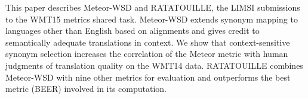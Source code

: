 This paper describes Meteor-WSD and RATATOUILLE, the LIMSI submissions to the WMT15 metrics shared task. Meteor-WSD extends synonym mapping to languages other than English based on alignments and gives credit to semantically adequate translations in context. We show that context-sensitive synonym selection increases the correlation of the Meteor metric with human judgments of translation quality on the WMT14 data. RATATOUILLE combines Meteor-WSD with nine other metrics for evaluation and outperforms the best metric (BEER) involved in its computation.
